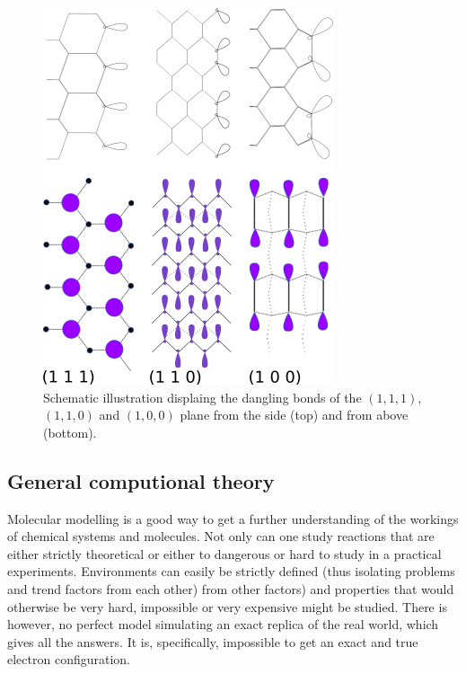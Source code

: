 \documentclass[10pt,a4paper]{article}
\begin{document}
\begin{figure} \captionsetup{width=.5\linewidth} \caption{Schematic illustration displaing the dangling bonds of the $(1,  1, 1)$, $(1,  1,  0)$ and $(1,  0,  0)$ plane from the side (top) and from above (bottom).} \label{dangling_bonds}
\includegraphics[width=.5\linewidth]{pictures/dangling_bonds.png}
\end{figure} 

\subsection{General computional theory}
Molecular modelling is a good way to get a further understanding of the workings of chemical systems and molecules.  Not only can one study reactions that are either strictly theoretical or either to dangerous or hard to study in a practical experiments. Environments can easily be strictly defined (thus isolating problems and trend factors from each other) from other factors) and properties that would otherwise be very hard, impossible or very expensive might be studied. There is however, no perfect model simulating an exact replica of the real world, which gives all the answers. It is, specifically, impossible to get an exact and true electron configuration.
\end{document}
